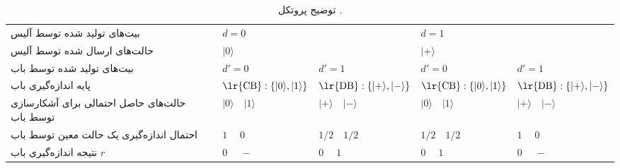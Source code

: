 \begin{table}[ht]
	\centering
	\caption{توضیح پروتکل .}
	\label{tab:6-1}
	\footnotesize
	\renewcommand{\arraystretch}{1.8} %
	\begin{tabular}{|p{4.5cm} | l | l | l | l |}
		\hline
		\rowcolor{tablezebra}
		بیت‌های تولید شده توسط آلیس & \multicolumn{2}{l|}{$d = 0$} & \multicolumn{2}{l|}{$d = 1$} \\
		حالت‌های ارسال شده توسط آلیس & \multicolumn{2}{l|}{$|0\rangle$} & \multicolumn{2}{l|}{$|+\rangle$} \\
		\rowcolor{tablezebra}
		بیت‌های تولید شده توسط باب & $d' = 0$ & \multicolumn{1}{l|}{$d' = 1$} & $d' = 0$ & \multicolumn{1}{l|}{$d' = 1$} \\
		پایه اندازه‌گیری باب & 
		$\text{\lr{CB}}: \{|0\rangle, |1\rangle\}$ & \multicolumn{1}{l|}{$\text{\lr{DB}}: \{|+\rangle, |-\rangle\}$} & $\text{\lr{CB}}: \{|0\rangle, |1\rangle\}$ & \multicolumn{1}{l|}{$\text{\lr{DB}}: \{|+\rangle, |-\rangle\}$} \\
		\rowcolor{tablezebra}
		 حالت‌های حاصل احتمالی برای آشکارسازی توسط باب & $|0\rangle \quad |1\rangle$ & \multicolumn{1}{l|}{$|+\rangle \quad |-\rangle$} & $|0\rangle \quad |1\rangle$ & \multicolumn{1}{l|}{$|+\rangle \quad |-\rangle$} \\
		احتمال اندازه‌گیری یک حالت معین توسط باب & $1 \quad\; 0$ & \multicolumn{1}{l|}{$1/2 \quad 1/2$} & $1/2 \quad 1/2$ & \multicolumn{1}{l|}{$1 \quad\; 0$} \\
		\rowcolor{tablezebra}
		نتیجه اندازه‌گیری باب $r$ & $0 \quad\; -$ & \multicolumn{1}{l|}{$0 \quad\; 1$} & $0 \quad\; 1$ & \multicolumn{1}{l|}{$0 \quad\; -$} \\
		\hline
	\end{tabular}
\end{table}



